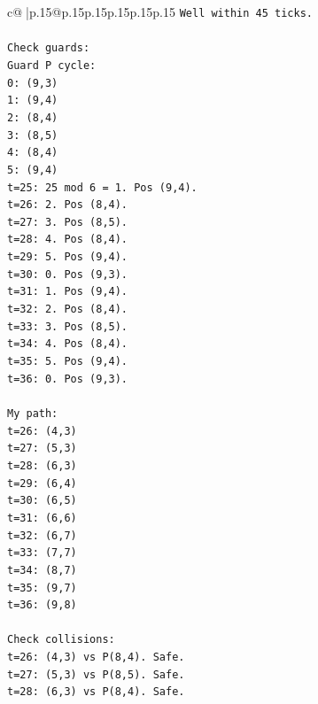 \documentclass{article}
\begin{document}
{\begin{supertabular}{c@{$\;$}|p{.15\linewidth}@{}p{.15\linewidth}p{.15\linewidth}p{.15\linewidth}p{.15\linewidth}p{.15\linewidth}}
{{{\texttt{Well within 45 ticks.} \\
\\ 
\texttt{Check guards:} \\
\texttt{Guard P cycle:} \\
\texttt{0: (9,3)} \\
\texttt{1: (9,4)} \\
\texttt{2: (8,4)} \\
\texttt{3: (8,5)} \\
\texttt{4: (8,4)} \\
\texttt{5: (9,4)} \\
\texttt{t=25: 25 mod 6 = 1. Pos (9,4).} \\
\texttt{t=26: 2. Pos (8,4).} \\
\texttt{t=27: 3. Pos (8,5).} \\
\texttt{t=28: 4. Pos (8,4).} \\
\texttt{t=29: 5. Pos (9,4).} \\
\texttt{t=30: 0. Pos (9,3).} \\
\texttt{t=31: 1. Pos (9,4).} \\
\texttt{t=32: 2. Pos (8,4).} \\
\texttt{t=33: 3. Pos (8,5).} \\
\texttt{t=34: 4. Pos (8,4).} \\
\texttt{t=35: 5. Pos (9,4).} \\
\texttt{t=36: 0. Pos (9,3).} \\
\\ 
\texttt{My path:} \\
\texttt{t=26: (4,3)} \\
\texttt{t=27: (5,3)} \\
\texttt{t=28: (6,3)} \\
\texttt{t=29: (6,4)} \\
\texttt{t=30: (6,5)} \\
\texttt{t=31: (6,6)} \\
\texttt{t=32: (6,7)} \\
\texttt{t=33: (7,7)} \\
\texttt{t=34: (8,7)} \\
\texttt{t=35: (9,7)} \\
\texttt{t=36: (9,8)} \\
\\ 
\texttt{Check collisions:} \\
\texttt{t=26: (4,3) vs P(8,4). Safe.} \\
\texttt{t=27: (5,3) vs P(8,5). Safe.} \\
\texttt{t=28: (6,3) vs P(8,4). Safe.} \\
}}}
\end{supertabular}}
\end{document}
